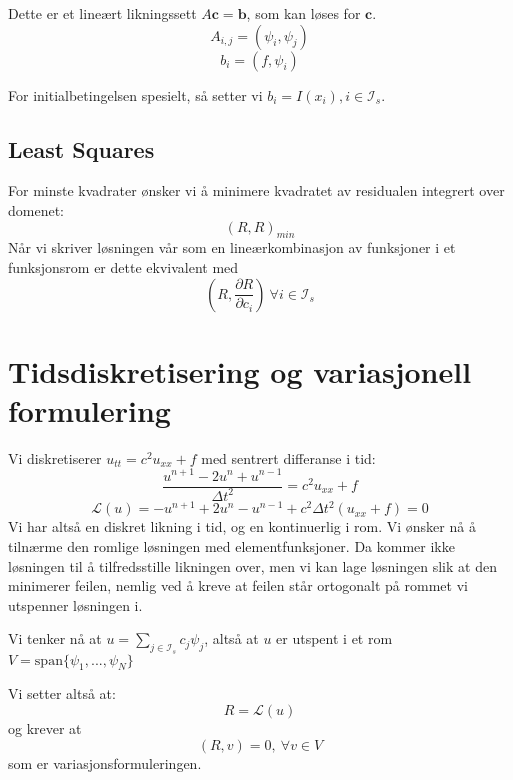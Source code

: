 \documentclass[a4paper, 10pt]{article}
\newcommand{\mb}{\mathbf}
\newcommand{\mc}{\mathcal}
\begin{document}
Dette er et lineært likningssett $A\mb{c} = \mb{b}$, som kan løses for $\mb{c}$.
\begin{equation}
	A_{i, j} = (\psi_i, \psi_j)
\end{equation}
\begin{equation}
	b_i = (f, \psi_i)
\end{equation}

For initialbetingelsen spesielt, så setter vi $b_i = I(x_i), i \in \mc{I}_s$.

\subsection{Least Squares}
For minste kvadrater ønsker vi å minimere kvadratet av residualen integrert over domenet:
\begin{equation}
	(R, R)_{min}
\end{equation}
Når vi skriver løsningen vår som en lineærkombinasjon av funksjoner i et funksjonsrom er dette ekvivalent med 
\begin{equation}
	\left( R, \frac{\partial R}{\partial c_i} \right) \ \forall i \in \mc{I}_s
\end{equation}

\section{Tidsdiskretisering og variasjonell formulering}
Vi diskretiserer $u_{tt} = c^2 u_{xx} + f$ med sentrert differanse i tid:
\begin{equation}
	\frac{u^{n+1} - 2 u^n + u^{n-1}}{\Delta t^2} = c^2 u_{xx} + f
\end{equation}
\begin{equation}
	 \mathcal{L}(u) = -u^{n+1} +2u^n - u^{n-1} + c^2 \Delta t^2 (u_{xx} + f) = 0
\end{equation}
Vi har altså en diskret likning i tid, og en kontinuerlig i rom. Vi ønsker nå å tilnærme den romlige løsningen med elementfunksjoner. Da kommer ikke løsningen til å tilfredsstille likningen over, men vi kan lage løsningen slik at den minimerer feilen, nemlig ved å kreve at feilen står ortogonalt på rommet vi utspenner løsningen i.

Vi tenker nå at $u = \sum_{j \in \mc{I}_s} c_j \psi_j$, altså at $u$ er utspent i et rom $V = \mbox{span}\{\psi_1, ..., \psi_N\}$

Vi setter altså at:
\begin{equation}
	R = \mathcal{L}(u)
\end{equation}
og krever at
\begin{equation}
	(R, v) = 0, \ \forall v \in V
\end{equation}
som er variasjonsformuleringen.
\end{document}
